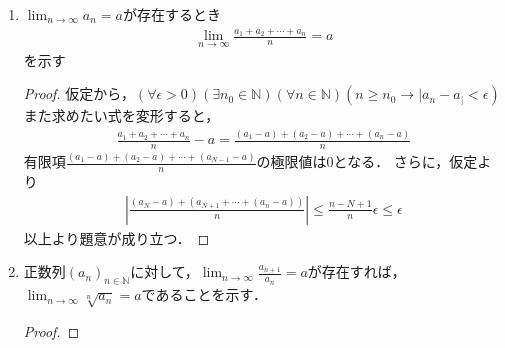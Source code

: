 \documentclass{ltjsarticle}
\theoremstyle{definition}
\theoremstyle{propcorollarystyle}
\theoremstyle{thmcorollarystyle}
\begin{document}
\begin{enumerate}[label={\arabic*}),itemsep=1em]
\begin{proof}
\[\begin{cases}
      1, & \text{if } |\cos(n!\pi x)| = 1, \\[4pt]
      0, & \text{otherwise.}
    \end{cases}
    \]
    $|\cos(\theta)|=1$となるのは，$\theta=k\pi$の時に限る．つまり，$n!x\in\mathbb{Z}$である．\\
    つづいて，$x\in\mathbb{Z}\Rightarrow\frac{p}{q}　p, q\in\mathbb{Z}$であれば，分母$q$はある$n\geq\text{で}n!$に含まれるので，十分大きな$n$以降で成り立つため，
    \begin{align*}
      f(x) = 1 \quad(x \in \mathbb{Q})
    \end{align*}
    $x\notin\mathbb{Q}$であれば，$n!x\in\mathbb{Z}$とすると$x$は有理数$\frac{k}{n!}$となり矛盾するため，
    \begin{align*}
      f(x) = 0 \quad(x \notin \mathbb{Q})
    \end{align*}
    以上より，
    \[
    f(x) = 
    \begin{cases}
      1, &x \in Q, \\[4pt]
      0, &\text{otherwise.}
    \end{cases}
    \]
  \end{proof}
  \item $\lim_{n \rightarrow \infty} a_n=a$が存在するとき
  \begin{align*}
    \lim_{n \rightarrow \infty} \frac{a_1 +a_2 + \cdots +a_n}{n}=a
  \end{align*}
  を示す
  \begin{proof}
    仮定から，$(\forall \epsilon>0)(\exists n_0 \in \mathbb{N})(\forall n\in \mathbb{N})(n\ge n_0\rightarrow|a_n-a_|<\epsilon)$\\
    また求めたい式を変形すると，
    \begin{align*}
      \frac{a_1 +a_2 + \cdots +a_n}{n}-a = \frac{(a_1-a) +(a_2-a) + \cdots +(a_n-a)}{n}
    \end{align*}
    有限項$\frac{(a_1-a)+(a_2-a)+\cdots+(a_{N-1}-a)}{n}$の極限値は0となる．
    さらに，仮定より
    \begin{align*}
      |\frac{(a_N-a)+(a_{N+1}+\cdots+(a_n-a))}{n}|\le \frac{n-N+1}{n}\epsilon \le \epsilon
    \end{align*}
    以上より題意が成り立つ．
  \end{proof}
  \item 正数列$(a_n)_{n \in \mathbb{N}}$に対して，$\lim_{n \rightarrow \infty} \frac{a_{n+1}}{a_n}=a$が存在すれば，
  $\lim_{n \rightarrow \infty} \sqrt[n]{a_n}=a$であることを示す．
  \begin{proof}

\end{proof}
\end{enumerate}
\end{document}
